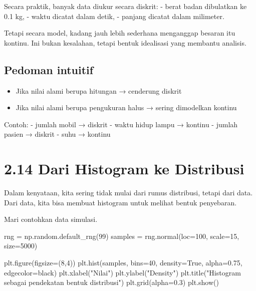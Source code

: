 \documentclass[
  letterpaper,
  DIV=11,
  numbers=noendperiod]{scrreprt}
\newenvironment{Shaded}{\begin{snugshade}}{\end{snugshade}}
\newcommand{\DecValTok}[1]{\textcolor[rgb]{0.68,0.00,0.00}{#1}}
\newcommand{\FloatTok}[1]{\textcolor[rgb]{0.68,0.00,0.00}{#1}}
\newcommand{\NormalTok}[1]{\textcolor[rgb]{0.00,0.23,0.31}{#1}}
\newcommand{\OperatorTok}[1]{\textcolor[rgb]{0.37,0.37,0.37}{#1}}
\newcommand{\StringTok}[1]{\textcolor[rgb]{0.13,0.47,0.30}{#1}}
\newcommand{\VariableTok}[1]{\textcolor[rgb]{0.07,0.07,0.07}{#1}}
\providecommand{\tightlist}{%
  \setlength{\itemsep}{0pt}\setlength{\parskip}{0pt}}
\begin{document}
Secara praktik, banyak data diukur secara diskrit: - berat badan
dibulatkan ke 0.1 kg, - waktu dicatat dalam detik, - panjang dicatat
dalam milimeter.

Tetapi secara model, kadang jauh lebih sederhana menganggap besaran itu
kontinu. Ini bukan kesalahan, tetapi bentuk idealisasi yang membantu
analisis.

\subsection{Pedoman intuitif}\label{pedoman-intuitif}

\begin{itemize}
\tightlist
\item
  Jika nilai alami berupa hitungan → cenderung diskrit
\item
  Jika nilai alami berupa pengukuran halus → sering dimodelkan kontinu
\end{itemize}

Contoh: - jumlah mobil → diskrit - waktu hidup lampu → kontinu - jumlah
pasien → diskrit - suhu → kontinu

\section{2.14 Dari Histogram ke
Distribusi}\label{dari-histogram-ke-distribusi}

Dalam kenyataan, kita sering tidak mulai dari rumus distribusi, tetapi
dari data. Dari data, kita bisa membuat histogram untuk melihat bentuk
penyebaran.

Mari contohkan data simulasi.

\begin{Shaded}
\begin{Highlighting}[]
\NormalTok{rng }\OperatorTok{=}\NormalTok{ np.random.default\_rng(}\DecValTok{99}\NormalTok{)}
\NormalTok{samples }\OperatorTok{=}\NormalTok{ rng.normal(loc}\OperatorTok{=}\DecValTok{100}\NormalTok{, scale}\OperatorTok{=}\DecValTok{15}\NormalTok{, size}\OperatorTok{=}\DecValTok{5000}\NormalTok{)}

\NormalTok{plt.figure(figsize}\OperatorTok{=}\NormalTok{(}\DecValTok{8}\NormalTok{,}\DecValTok{4}\NormalTok{))}
\NormalTok{plt.hist(samples, bins}\OperatorTok{=}\DecValTok{40}\NormalTok{, density}\OperatorTok{=}\VariableTok{True}\NormalTok{, alpha}\OperatorTok{=}\FloatTok{0.75}\NormalTok{, edgecolor}\OperatorTok{=}\StringTok{\textquotesingle{}black\textquotesingle{}}\NormalTok{)}
\NormalTok{plt.xlabel(}\StringTok{"Nilai"}\NormalTok{)}
\NormalTok{plt.ylabel(}\StringTok{"Density"}\NormalTok{)}
\NormalTok{plt.title(}\StringTok{"Histogram sebagai pendekatan bentuk distribusi"}\NormalTok{)}
\NormalTok{plt.grid(alpha}\OperatorTok{=}\FloatTok{0.3}\NormalTok{)}
\NormalTok{plt.show()}
\end{Highlighting}
\end{Shaded}
\end{document}

